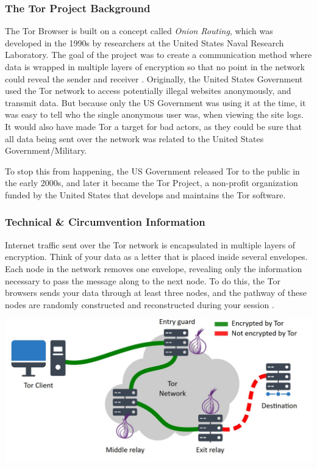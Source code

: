 \subsubsection{The Tor Project Background}

The Tor Browser is built on a concept called \textit{Onion Routing}, which was developed in the 1990s by researchers at the United States Naval Research Laboratory. The goal of the project was to create a communication method where data is wrapped in multiple layers of encryption so that no point in the network could reveal the sender and receiver \cite{torprojectProjectPrivacy}. Originally, the United States Government used the Tor network to access potentially illegal websites anonymously, and transmit data. But because only the US Government was using it at the time, it was easy to tell who the single anonymous user was, when viewing the site logs. It would also have made Tor a target for bad actors, as they could be sure that all data being sent over the network was related to the United States Government/Military.

To stop this from happening, the US Government released Tor to the public in the early 2000s, and later it became the Tor Project, a non-profit organization funded by the United States that develops and maintains the Tor software. 

\subsubsection{Technical \& Circumvention Information}

Internet traffic sent over the Tor network is encapsulated in multiple layers of encryption. Think of your data as a letter that is placed inside several envelopes. Each node in the network removes one envelope, revealing only the information necessary to pass the message along to the next node. To do this, the Tor browsers sends your data through at least three nodes, and the pathway of these nodes are randomly constructed and reconstructed during your session \cite{dingledine2004tor}.

\centerline{\includegraphics[width=480pt]{Griff/Latex/TCD SCSS CAPSTONE/Literature Review/How tor works.jpg}}

